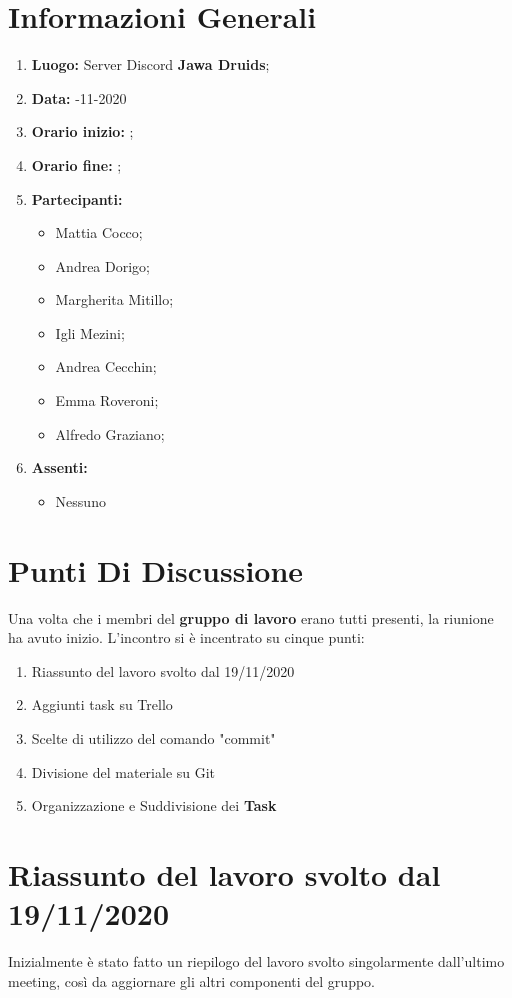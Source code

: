 \newpage
	\section{Informazioni Generali}
	\begin{enumerate}
		\item \textbf{Luogo:} \normalfont Server Discord \textbf{Jawa Druids};
		\item \textbf{Data:} -11-2020
		\item \textbf{Orario inizio:} ;
		\item \textbf{Orario fine:} ;
		\item \textbf{Partecipanti:}
		\begin{itemize}
			\item Mattia Cocco;
			\item Andrea Dorigo;
			\item Margherita Mitillo;
			\item Igli Mezini;
			\item Andrea Cecchin;
			\item Emma Roveroni;
			\item Alfredo Graziano;
		\end{itemize}
		\item \textbf{Assenti:}
		\begin{itemize}
			\item Nessuno
		\end{itemize}
	\end{enumerate}
	\section{Punti Di Discussione}	
	Una volta che i membri del \textbf{gruppo di lavoro} erano tutti presenti, la riunione ha avuto inizio.
	L'incontro si è incentrato su cinque punti:
	\begin{enumerate}
		\item Riassunto del lavoro svolto dal 19/11/2020
		\item Aggiunti task su Trello
		\item Scelte di utilizzo del comando "commit"
		\item Divisione del materiale su Git
		\item Organizzazione e Suddivisione dei \textbf{Task}
	\end{enumerate}
	
	\section{Riassunto del lavoro svolto dal 19/11/2020}
	Inizialmente è stato fatto un riepilogo del lavoro svolto singolarmente dall'ultimo meeting, così da aggiornare gli altri componenti del gruppo.
	
